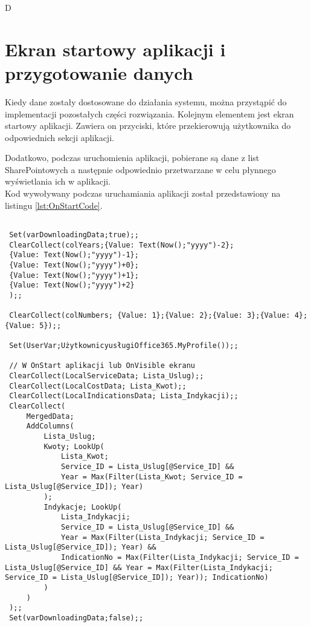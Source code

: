 D\section{Ekran startowy aplikacji i przygotowanie danych}
Kiedy dane zostały dostosowane do działania systemu, można przystąpić do implementacji pozostałych części rozwiązania.
Kolejnym elementem jest ekran startowy aplikacji. Zawiera on przyciski, które przekierowują użytkownika do odpowiednich sekcji aplikacji.


Dodatkowo, podczas uruchomienia aplikacji, pobierane są dane z list SharePointowych a następnie odpowiednio przetwarzane w celu płynnego wyświetlania ich w aplikacji. \\
Kod wywoływany podczas uruchamiania aplikacji został przedstawiony na listingu \ref{lst:OnStartCode}.

\begin{lstlisting}[language=PowerFx]
    
 Set(varDownloadingData;true);;
 ClearCollect(colYears;{Value: Text(Now();"yyyy")-2};
 {Value: Text(Now();"yyyy")-1};
 {Value: Text(Now();"yyyy")+0};
 {Value: Text(Now();"yyyy")+1};
 {Value: Text(Now();"yyyy")+2}
 );;
 
 ClearCollect(colNumbers; {Value: 1};{Value: 2};{Value: 3};{Value: 4};{Value: 5});;
 
 Set(UserVar;UżytkownicyusługiOffice365.MyProfile());;
 
 // W OnStart aplikacji lub OnVisible ekranu
 ClearCollect(LocalServiceData; Lista_Uslug);;
 ClearCollect(LocalCostData; Lista_Kwot);;
 ClearCollect(LocalIndicationsData; Lista_Indykacji);;
 ClearCollect(
     MergedData;
     AddColumns(
         Lista_Uslug;
         Kwoty; LookUp(
             Lista_Kwot;
             Service_ID = Lista_Uslug[@Service_ID] &&
             Year = Max(Filter(Lista_Kwot; Service_ID = Lista_Uslug[@Service_ID]); Year)
         );
         Indykacje; LookUp(
             Lista_Indykacji;
             Service_ID = Lista_Uslug[@Service_ID] &&
             Year = Max(Filter(Lista_Indykacji; Service_ID = Lista_Uslug[@Service_ID]); Year) &&
             IndicationNo = Max(Filter(Lista_Indykacji; Service_ID = Lista_Uslug[@Service_ID] && Year = Max(Filter(Lista_Indykacji; Service_ID = Lista_Uslug[@Service_ID]); Year)); IndicationNo)
         )
     )
 );;
 Set(varDownloadingData;false);;
 \end{lstlisting}

